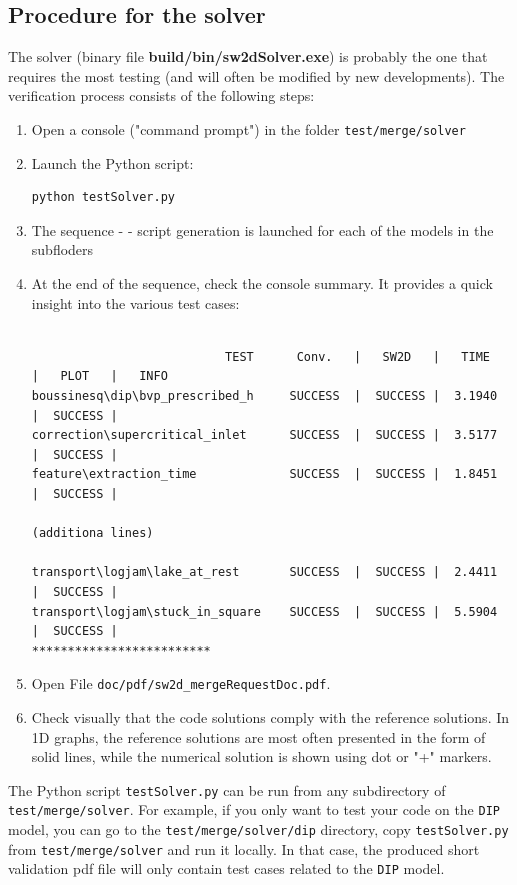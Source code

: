 \subsection{Procedure for the solver}
The solver (binary file \textbf{build/bin/sw2dSolver.exe}) is probably the one that requires the most testing (and will often be modified by new developments). The verification process consists of the following steps:
\begin{enumerate}
\item Open a console ("command prompt") in the folder \texttt{test/merge/solver}
\item Launch the Python script:
\begin{lstlisting}
python testSolver.py
\end{lstlisting}
\item The sequence \swConverter - \swSolver - script generation is launched for each of the models in the subfloders
\item At the end of the sequence, check the console summary. It provides a quick insight into the various test cases:
\begin{lstlisting}[basicstyle=\tiny]

                           TEST      Conv.   |   SW2D   |   TIME   |   PLOT   |   INFO
boussinesq\dip\bvp_prescribed_h     SUCCESS  |  SUCCESS |  3.1940  |  SUCCESS |
correction\supercritical_inlet      SUCCESS  |  SUCCESS |  3.5177  |  SUCCESS |
feature\extraction_time             SUCCESS  |  SUCCESS |  1.8451  |  SUCCESS |

(additiona lines)

transport\logjam\lake_at_rest       SUCCESS  |  SUCCESS |  2.4411  |  SUCCESS |
transport\logjam\stuck_in_square    SUCCESS  |  SUCCESS |  5.5904  |  SUCCESS |
*************************
\end{lstlisting}
\item Open File \texttt{doc/pdf/sw2d\_mergeRequestDoc.pdf}.
\item Check visually that the code solutions comply with the reference solutions. In 1D graphs, the reference solutions are most often presented in the form of solid lines, while the numerical solution is shown using dot or "+" markers. 
\end{enumerate}

{\remark The Python script \texttt{testSolver.py} can be run from any subdirectory of \texttt{test/merge/solver}. 
For example, if you only want to test your code on the \texttt{DIP} model, you can go to the \texttt{test/merge/solver/dip} directory, 
copy \texttt{testSolver.py} from \texttt{test/merge/solver} and run it locally. In that case, 
the produced short validation pdf file will only contain test cases related to the \texttt{DIP} model.}
